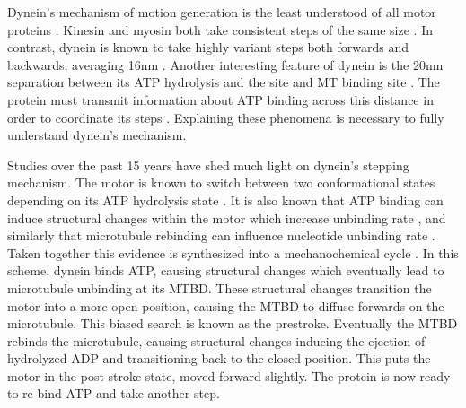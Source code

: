 \documentclass[9pt,twocolumn,twoside]{article}
\begin{document}
Dynein's mechanism of motion generation is the least understood of all motor proteins \cite{}. Kinesin and myosin both take consistent steps of the same size \cite{kinesin-step-size, myosin-step-size, is-this-true-in-general-i-thought-only-types-of-myosin}. In contrast, dynein is known to take highly variant steps both forwards and backwards, averaging 16nm \cite{yildizpaper, weihongpaper}. Another interesting feature of dynein is the 20nm separation between its ATP hydrolysis and the site and MT binding site \cite{3vkh-cite}. The protein must transmit information about ATP binding across this distance in order to coordinate its steps \cite{mt-atp-coupling}. Explaining these phenomena is necessary to fully understand dynein's mechanism.

Studies over the past 15 years have shed much light on dynein's stepping mechanism. The motor is known to switch between two conformational states depending on its ATP hydrolysis state \cite{burgess-paper, FRETstatepaper, carter-paper, nicastro, schmidt-carter}. It is also known that ATP binding can induce structural changes within the motor which increase unbinding rate \cite{leschziner, carter-paper}, and similarly that microtubule rebinding can influence nucleotide unbinding rate \cite{mt-atp-coupling}. Taken together this evidence is synthesized into a mechanochemical cycle \cite{cianfroccoreview, imamulamodel, tsygankovscheme}. In this scheme, dynein binds ATP, causing structural changes which eventually lead to microtubule unbinding at its MTBD. These structural changes transition the motor into a more open position, causing the MTBD to diffuse forwards on the microtubule. This biased search is known as the prestroke. Eventually the MTBD rebinds the microtubule, causing structural changes inducing the ejection of hydrolyzed ADP and transitioning back to the closed position. This puts the motor in the post-stroke state, moved forward slightly. The protein is now ready to re-bind ATP and take another step.
\end{document}
